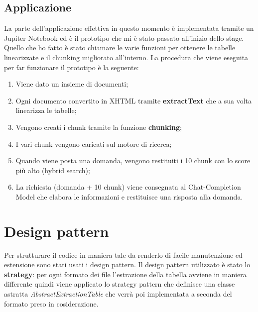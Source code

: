 \subsection{Applicazione}
La parte dell'applicazione effettiva in questo momento è implementata tramite un Jupiter Notebook ed è il prototipo che mi è stato passato all'inizio dello stage.
Quello che ho fatto è stato chiamare le varie funzioni per ottenere le tabelle linearizzate e il chunking migliorato all'interno.
La procedura che viene eseguita per far funzionare il prototipo è la seguente:
\begin{enumerate}
    \item Viene dato un insieme di documenti;
    \item Ogni documento convertito in XHTML tramite \textbf{extractText} che a sua volta linearizza le tabelle;
    \item Vengono creati i chunk tramite la funzione \textbf{chunking};
    \item I vari chunk vengono caricati sul motore di ricerca;
    \item Quando viene posta una domanda, vengono restituiti i 10 chunk con lo score più alto (hybrid search);
    \item La richiesta (domanda + 10 chunk) viene consegnata al Chat-Completion Model che elabora le informazioni e restituisce una risposta alla domanda. 
\end{enumerate}

\section{Design pattern}

Per strutturare il codice in maniera tale da renderlo di facile manutenzione ed estensione sono stati usati i \gls{design pattern}\glsfirstoccur.
Il design pattern utilizzato è stato lo \textbf{\gls{strategy}}\glsfirstoccur: per ogni formato dei file l'estrazione della tabella avviene in maniera differente quindi viene applicato lo strategy pattern che definisce una classe astratta \emph{AbstractExtractionTable} che verrà poi implementata a seconda del formato preso in cosiderazione. 
